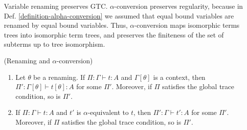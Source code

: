 
Variable renaming preserves GTC. $\alpha$-conversion preserves regularity, because
in Def. \ref{definition-alpha-conversion} 
we assumed that equal bound variables are renamed by equal bound variables.
Thus, $\alpha$-conversion maps isomorphic terms trees into isomorphic term trees,
and preserves the finiteness of the set of subterms up to tree isomorphism.

\begin{proposition}(Renaming and $\alpha$-conversion)
\label{prop:renaming}
  \begin{enumerate}
  \item\label{prop:renaming1}
    Let $\theta$ be a renaming.
    If $\Pi:\Gamma\vdash t:A$ and $\Gamma[\theta]$ is a context, 
    then $\Pi':\Gamma[\theta]\vdash t[\theta]:A$ for some $\Pi'$.
    Moreover, if $\Pi$ satisfies the global trace condition, so is $\Pi'$.
  \item\label{prop:renaming2}
    If $\Pi:\Gamma\vdash t:A$ and $t'$ is $\alpha$-equivalent to $t$,
    then $\Pi':\Gamma\vdash t':A$ for some $\Pi'$.
    Moreover, if $\Pi$ satisfies the global trace condition, so is $\Pi'$.
  \end{enumerate}
\end{proposition}


